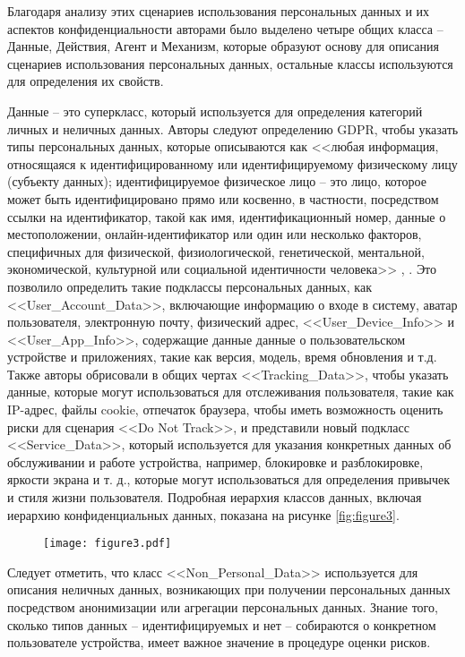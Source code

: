 \documentclass[../main]{subfiles}
\begin{document}
Благодаря анализу этих сценариев использования персональных данных и их аспектов конфиденциальности авторами было выделено четыре общих класса -- Данные, Действия, Агент и Механизм, которые образуют основу для описания сценариев использования персональных данных, остальные классы используются для определения их свойств.

Данные -- это суперкласс, который используется для определения категорий личных и неличных данных. Авторы следуют определению GDPR, чтобы указать типы персональных данных, которые описываются как <<любая информация, относящаяся к идентифицированному или идентифицируемому физическому лицу (субъекту данных); идентифицируемое физическое лицо -- это лицо, которое может быть идентифицировано прямо или косвенно, в частности, посредством ссылки на идентификатор, такой как имя, идентификационный номер, данные о местоположении, онлайн-идентификатор или один или несколько факторов, специфичных для физической, физиологической, генетической, ментальной, экономической, культурной или социальной идентичности человека>> \cite{GDPR}, \cite{MDPI4}. Это позволило определить такие подклассы персональных данных, как <<User\_Account\_Data>>, включающие информацию о входе в систему, аватар пользователя, электронную почту, физический адрес, <<User\_Device\_Info>> и <<User\_App\_Info>>, содержащие данные данные о пользовательском устройстве и приложениях, такие как версия, модель, время обновления и т.д. Также авторы обрисовали в общих чертах <<Tracking\_Data>>, чтобы указать данные, которые могут использоваться для отслеживания пользователя, такие как IP-адрес, файлы cookie, отпечаток браузера, чтобы иметь возможность оценить риски для сценария <<Do Not Track>>, и представили новый подкласс <<Service\_Data>>, который используется для указания конкретных данных об обслуживании и работе устройства, например, блокировке и разблокировке, яркости экрана и т. д., которые могут использоваться для определения привычек и стиля жизни пользователя. Подробная иерархия классов данных, включая иерархию конфиденциальных данных, показана на рисунке \ref{fig:figure3}.

\begin{figure}[H]
    \centering
    {\texttt{[image: figure3.pdf]}}
    \vspace{-\baselineskip}
\end{figure}

Следует отметить, что класс <<Non\_Personal\_Data>> используется для описания неличных данных, возникающих при получении персональных данных посредством анонимизации или агрегации персональных данных. Знание того, сколько типов данных -- идентифицируемых и нет -- собираются о конкретном пользователе устройства, имеет важное значение в процедуре оценки рисков.
\end{document}
